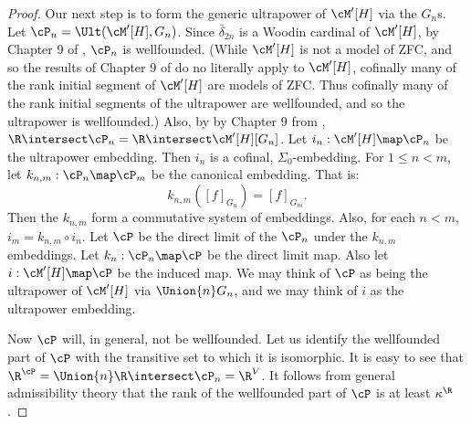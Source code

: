 \begin{proof}
Our next step is to form the generic ultrapower of $\cM^{\prime}[H]$ via
the $G_n$s.
Let $\cP_n=\Ult(\cM^{\prime}[H],G_n)$. Since $\bar{\delta}_{2n}$ is a Woodin
cardinal of $\cM^{\prime}[H]$, by Chapter 9 of \cite{Martin_Book},
$\cP_n$ is wellfounded.
(While $\cM^{\prime}[H]$ is not a model of ZFC, and so the results of
Chapter 9 of \cite{Martin_Book} do no literally apply to $\cM^{\prime}[H]$,
cofinally many of the rank initial segment of $\cM^{\prime}[H]$ are models
of ZFC. Thus cofinally many of the rank initial segments of the ultrapower
are wellfounded, and so the ultrapower is wellfounded.)
Also, by by Chapter 9 from \cite{Martin_Book},
$\R\intersect\cP_n=\R\intersect\cM^{\prime}[H][G_n]$.
Let \mbox{$i_n:\cM^{\prime}[H]\map\cP_n$} be the ultrapower embedding. Then
$i_n$ is a cofinal, $\Sigma_0$-embedding.
 For $1\leq n<m$, let $k_{n,m}:\cP_n\map\cP_m$
be the canonical embedding. That is:
$$k_{n,m}\left([f]_{G_n}\right)=[f]_{G_m}.$$
Then the $k_{n,m}$ form a commutative system of embeddings.
Also, for each $n<m$, $i_m=k_{n,m}\circ i_n$.
Let $\cP$ be the direct limit of the $\cP_n$ under the $k_{n,m}$ embeddings.
Let $k_n:\cP_n\map\cP$ be the direct limit map.
Also let $i:\cM^{\prime}[H]\map\cP$ be the induced map.
We may think of $\cP$ as
being the ultrapower of $\cM^{\prime}[H]$ via $\Union{n} G_n$, and we may
think of $i$ as the ultrapower embedding.

Now $\cP$ will, in general, not be wellfounded. Let us identify the
wellfounded part of $\cP$ with the transitive set to which it is
isomorphic. It is easy to see that $\R^{\cP}=\Union{n}\R\intersect\cP_n
=\R^{V}$.
It follows from general admissibility
theory that the rank of the
wellfounded part of $\cP$ is at least $\kappa^{\R}$.


\end{proof}
